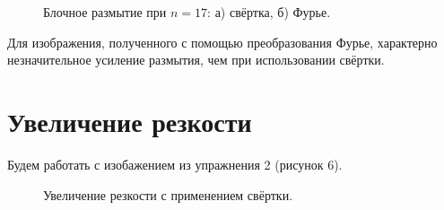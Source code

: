 \documentclass[a5paper, 10pt]{article}
\theoremstyle{definition}
\theoremstyle{plain}
\theoremstyle{remark}
\begin{document}
\begin{figure}[h!]
\begin{minipage}[h!]{0.47\linewidth}
\end{minipage}
\caption{Блочное размытие при $n= 17$: а) свёртка, б) Фурье.}
\end{figure}

Для изображения, полученного с помощью преобразования Фурье, характерно незначительное усиление размытия, чем при использовании свёртки.



\section{Увеличение резкости}
Будем работать с изобажением из упражнения 2 (рисунок 6).

\begin{figure}[h!]
\caption{Увеличение резкости с применением свёртки.}
\end{figure}
\end{document}
